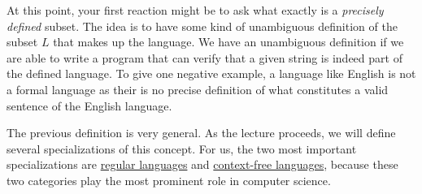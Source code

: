 At this point, your first reaction might be to ask what exactly is a \emph{precisely defined} subset.  The idea
is to have some kind of unambiguous definition of the subset $L$ that makes up the language.  We have an
unambiguous definition if we are able to write a program that can verify that a given string is indeed part
of the defined language.  To give one negative example,
a language like English is not a formal language as their is no precise definition of what constitutes a valid
sentence of the English language.

The previous definition is very general.  As the lecture proceeds, we will define several
specializations of this concept.  For us, the two most important specializations are 
\href{http://en.wikipedia.org/wiki/Regular_language}{regular languages} and
\href{http://en.wikipedia.org/wiki/Context-free_language}{context-free languages}, 
because these two categories  play the most prominent role in computer science. 


